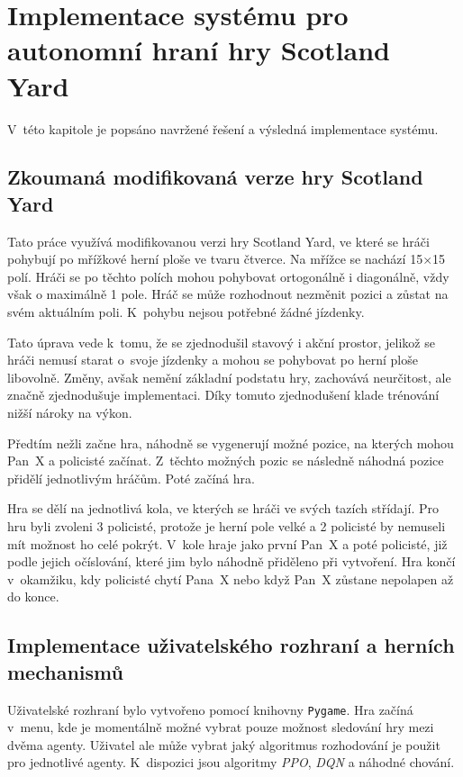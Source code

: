 \chapter{Implementace systému pro autonomní hraní hry Scotland Yard}
\label{ch:navrh}
V~této kapitole je popsáno navržené řešení a výsledná implementace systému.
\section{Zkoumaná modifikovaná verze hry Scotland Yard}\label{sec:zkoumana-modifikovana-verze-hry-scotland-yard}

Tato práce využívá modifikovanou verzi hry Scotland Yard, ve které se hráči pohybují po mřížkové herní ploše ve tvaru čtverce.
Na mřížce se nachází 15$\times$15 polí.
Hráči se po těchto polích mohou pohybovat ortogonálně i diagonálně, vždy však o maximálně 1 pole.
Hráč se může rozhodnout nezměnit pozici a zůstat na svém aktuálním poli.
K~pohybu nejsou potřebné žádné jízdenky.

Tato úprava vede k~tomu, že se zjednodušil stavový i akční prostor, jelikož se hráči nemusí starat o~svoje jízdenky a mohou se pohybovat po herní ploše libovolně.
Změny, avšak nemění základní podstatu hry, zachovává neurčitost, ale značně zjednodušuje implementaci.
Díky tomuto zjednodušení klade trénování nižší nároky na výkon.

Předtím nežli začne hra, náhodně se vygenerují možné pozice, na kterých mohou Pan~X a policisté začínat.
Z~těchto možných pozic se následně náhodná pozice přidělí jednotlivým hráčům.
Poté začíná hra.

Hra se dělí na jednotlivá kola, ve kterých se hráči ve svých tazích střídají.
Pro hru byli zvoleni 3 policisté, protože je herní pole velké a 2 policisté by nemuseli mít možnost ho celé pokrýt.
V~kole hraje jako první Pan~X a poté policisté, již podle jejich očíslování, které jim bylo náhodně přiděleno při vytvoření.
Hra končí v~okamžiku, kdy policisté chytí Pana~X nebo když Pan~X zůstane nepolapen až do konce.

\section{Implementace uživatelského rozhraní a herních mechanismů}\label{subsec:implementace-uzivatelskeho-rozrani-a-hernich-mechanismu}

Uživatelské rozhraní bylo vytvořeno pomocí knihovny \texttt{Pygame}.
Hra začíná v~menu, kde je momentálně možné vybrat pouze možnost sledování hry mezi dvěma agenty.
Uživatel ale může vybrat jaký algoritmus rozhodování je použit pro jednotlivé agenty.
K~dispozici jsou algoritmy \emph{PPO}, \emph{DQN} a náhodné chování.

